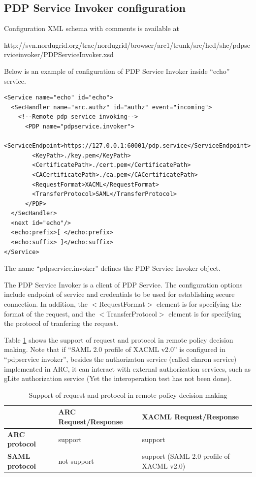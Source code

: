 \documentclass{article}                            %
\begin{document}
\subsection{PDP Service Invoker configuration} %
\label{subsec:pdpservice_invoker_conf}
Configuration XML schema with comments is available at 

http://svn.nordugrid.org/trac/nordugrid/browser/arc1/trunk/src/hed/shc/pdpserviceinvoker/PDPServiceInvoker.xsd

Below is an example of configuration of PDP Service Invoker inside ``echo'' service.

\begin{verbatim}
<Service name="echo" id="echo">
  <SecHandler name="arc.authz" id="authz" event="incoming">
    <!--Remote pdp service invoking-->
      <PDP name="pdpservice.invoker">
        <ServiceEndpoint>https://127.0.0.1:60001/pdp.service</ServiceEndpoint>
        <KeyPath>./key.pem</KeyPath>
        <CertificatePath>./cert.pem</CertificatePath>
        <CACertificatePath>./ca.pem</CACertificatePath>
        <RequestFormat>XACML</RequestFormat>
        <TransferProtocol>SAML</TransferProtocol>
      </PDP>
  </SecHandler>
  <next id="echo"/>
  <echo:prefix>[ </echo:prefix>
  <echo:suffix> ]</echo:suffix>
</Service>
\end{verbatim}

The name ``pdpservice.invoker'' defines the PDP Service Invoker object.

The PDP Service Invoker is a client of PDP Service. The configuration options include endpoint of service and credentials to be used for establishing secure connection. In addition, the $<$RequestFormat$>$ element is for specifying the format of the request, and the $<$TransferProtocol$>$ element is for specifying the protocol of tranfering the request.

Table \ref{table:support_pdp_request_protocol} shows the support of request and protocol in remote policy decision making. Note that if ``SAML 2.0 profile of XACML v2.0'' is configured in ``pdpservice invoker'', besides the authorizaton service (called charon service) implemented in ARC, it can interact with external authorization services, such as gLite authorization service (Yet the interoperation test has not been done).

\begin{table}[ht]
\caption{Support of request and protocol in remote policy decision making}
\centering
\begin{tabular}{| l | p{7cm} | p{5cm} |}
\hline
\textbf{  } & \textbf{ARC Request/Response} & \textbf{XACML Request/Response} \\ \hline
\textbf{ARC protocol} & support & support \\ \hline
\textbf{SAML protocol} & not support & support (SAML 2.0 profile of XACML v2.0) \\ \hline
\end{tabular}
\label{table:support_pdp_request_protocol}
\end{table}
\end{document}
